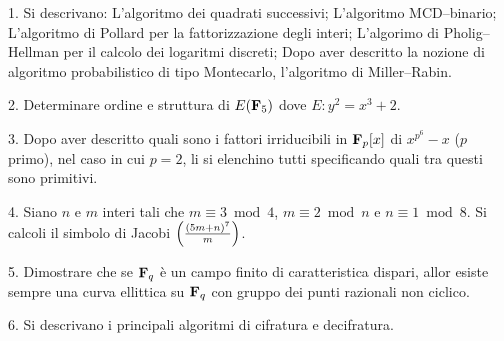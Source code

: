 \item{1.} Si descrivano:
 L'algoritmo dei quadrati successivi;
 L'algoritmo MCD--binario;
 L'algoritmo di Pollard per la fattorizzazione degli interi;
 L'algorimo di Pholig--Hellman per il calcolo dei logaritmi discreti; 
 Dopo aver descritto la nozione di algoritmo probabilistico di tipo Montecarlo, l'algoritmo di Miller--Rabin.  

\item{2.} Determinare ordine e struttura di $E({\bf F}_5)$ dove $E: y^2=x^3+2$.
\item{3.} Dopo aver descritto quali sono i fattori irriducibili in ${\bf F}_p[x]$ di $x^{p^6}-x$ ($p$ primo), nel caso in cui $p=2$, li
si elenchino tutti specificando quali tra questi sono primitivi.
\item{4.} Siano $n$ e $m$ interi tali che $m\equiv3\bmod4$, $m\equiv2\bmod n$ e $n\equiv1\bmod8$. Si calcoli il simbolo di Jacobi
$\left({(5m+n)^7\over m}\right)$.
\item{5.} Dimostrare che se ${\bf F}_q$ \`e un campo finito di caratteristica dispari,
allor esiste sempre una curva ellittica su ${\bf F}_q$ con gruppo dei punti razionali non ciclico.
\item{6.} Si descrivano i principali algoritmi di cifratura e decifratura.
\vfill

\bye